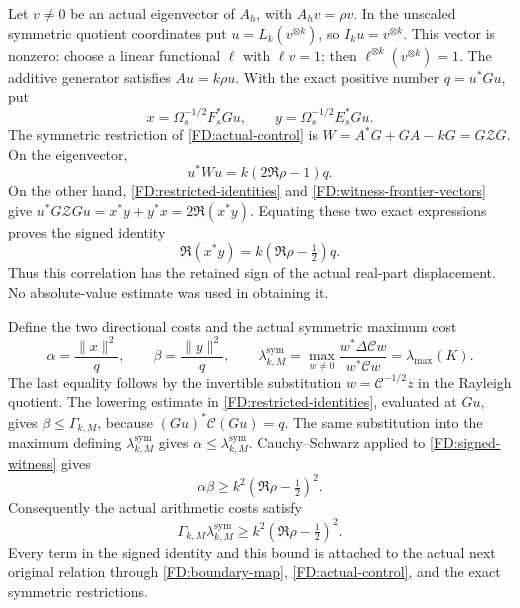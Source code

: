 Let \(v\ne0\) be an actual eigenvector of \(A_h\), with
\(A_hv=\rho v\).  In the unscaled symmetric quotient coordinates put
\(u=L_k(v^{\otimes k})\), so \(I_ku=v^{\otimes k}\).
This vector is nonzero: choose a linear functional \(\ell\) with
\(\ell v=1\); then \(\ell^{\otimes k}(v^{\otimes k})=1\).
The additive generator satisfies \(Au=k\rho u\).  With the exact
positive number \(q=u^*Gu\), put
\begin{equation}
x=\Omega_s^{-1/2}F_s^*Gu,\qquad
y=\Omega_s^{-1/2}E_s^*Gu.
\tag{FD.41}\label{FD:witness-frontier-vectors}
\end{equation}
The symmetric restriction of \eqref{FD:actual-control} is
\(W=A^*G+GA-kG=G\mathcal ZG\).  On the eigenvector,
\[
u^*Wu=k(2\Re\rho-1)q.
\]
On the other hand, \eqref{FD:restricted-identities} and
\eqref{FD:witness-frontier-vectors} give
\(u^*G\mathcal ZGu=x^*y+y^*x=2\Re(x^*y)\).
Equating these two exact expressions proves the signed identity
\begin{equation}
\boxed{\Re(x^*y)=k(\Re\rho-\tfrac12)q.}
\tag{FD.42}\label{FD:signed-witness}
\end{equation}
Thus this correlation has the retained sign of the actual real-part
displacement.  No absolute-value estimate was used in obtaining it.

Define the two directional costs and the actual symmetric maximum cost
\begin{equation}
\alpha=\frac{\|x\|^2}{q},\qquad
\beta=\frac{\|y\|^2}{q},\qquad
\lambda_{k,M}^{\mathrm{sym}}
=\max_{w\ne0}\frac{w^*\Delta\mathcal Cw}{w^*\mathcal Cw}
=\lambda_{\max}(K).
\tag{FD.43}\label{FD:relative-costs}
\end{equation}
The last equality follows by the invertible substitution
\(w=\mathcal C^{-1/2}z\) in the Rayleigh quotient.  The lowering
estimate in \eqref{FD:restricted-identities}, evaluated at \(Gu\),
gives \(\beta\le\Gamma_{k,M}\), because
\((Gu)^*\mathcal C(Gu)=q\).  The same substitution into the
maximum defining \(\lambda_{k,M}^{\mathrm{sym}}\) gives
\(\alpha\le\lambda_{k,M}^{\mathrm{sym}}\).  Cauchy--Schwarz applied
to \eqref{FD:signed-witness} gives
\[
\alpha\beta\ge k^2(\Re\rho-\tfrac12)^2.
\]
Consequently the actual arithmetic costs satisfy
\begin{equation}
\boxed{\Gamma_{k,M}\lambda_{k,M}^{\mathrm{sym}}
\ge k^2(\Re\rho-\tfrac12)^2.}
\tag{FD.44}\label{FD:quadratic-cost}
\end{equation}
Every term in the signed identity and this bound is attached to the
actual next original relation through \eqref{FD:boundary-map},
\eqref{FD:actual-control}, and the exact symmetric restrictions.


